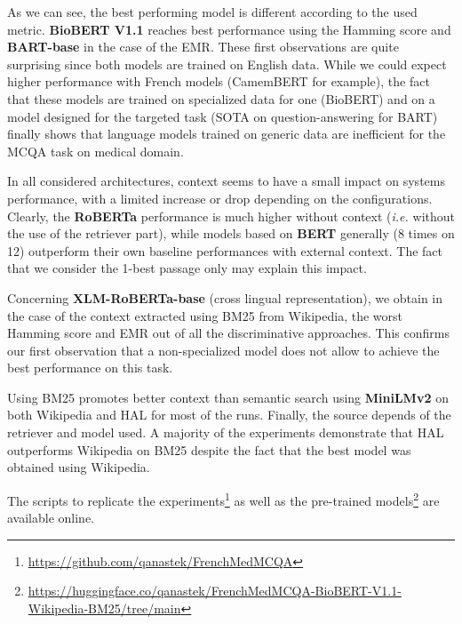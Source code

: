 \documentclass[11pt]{article}
\begin{document}
As we can see, the best performing model is different according to the used metric. \textbf{BioBERT V1.1} reaches best performance using the Hamming score and \textbf{BART-base} in the case of the EMR. These first observations are quite surprising since both models are trained on English data. While we could expect higher performance with French models (CamemBERT for example), the fact that these models are trained on specialized data for one (BioBERT) and on a model designed for the targeted task (SOTA on question-answering for BART) finally shows that language models trained on generic data are inefficient for the MCQA task on medical domain.

In all considered architectures, context seems to have a small impact on systems performance, with a limited increase or drop depending on the configurations. Clearly, the \textbf{RoBERTa} performance is much higher without context ({\it i.e.} without the use of the retriever part), while models based on \textbf{BERT} generally (8 times on 12) outperform their own baseline performances with external context. The fact that we consider the 1-best passage only may explain this impact. 



Concerning \textbf{XLM-RoBERTa-base} (cross lingual representation), we obtain in the case of the context extracted using BM25 from Wikipedia, the worst Hamming score and EMR out of all the discriminative approaches. This confirms our first observation that a non-specialized model does not allow to achieve the best performance on this task.

Using BM25 promotes better context than semantic search using \textbf{MiniLMv2} on both Wikipedia and HAL for most of the runs. Finally, the source depends of the retriever and model used. A majority of the experiments demonstrate that HAL outperforms Wikipedia on BM25 despite the fact that the best model was obtained using Wikipedia.

The scripts to replicate the experiments\footnote{\href{https://github.com/qanastek/FrenchMedMCQA}{https://github.com/qanastek/FrenchMedMCQA}} as well as the pre-trained models\footnote{\href{https://huggingface.co/qanastek/FrenchMedMCQA-BioBERT-V1.1-Wikipedia-BM25/tree/main}{https://huggingface.co/qanastek/FrenchMedMCQA-BioBERT-V1.1-Wikipedia-BM25/tree/main}} are available online.
\end{document}
